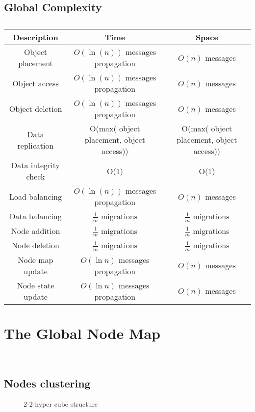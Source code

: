 \subsection{Global Complexity}
\begin{table}[h]
  \centering
  \begin{tabular}{|c|c|c|}
  \hline
  Description & Time & Space\\
  \hline
  Object placement & $O(\ln(n))$ messages propagation &  $O(n)$ messages  \\
  Object access & $O(\ln(n))$ messages propagation &  $O(n)$ messages \\
  Object deletion & $O(\ln(n))$ messages propagation &  $O(n)$ messages \\
  Data replication & O(max( object placement, object access)) & O(max( object placement, object access))\\
  Data integrity check & O(1) & O(1) \\
  Load balancing & $O(\ln(n))$ messages propagation &  $O(n)$ messages \\
  Data balancing & $\frac{1}{m}$ migrations & $\frac{1}{m}$ migrations\\ %
  Node addition & $\frac{1}{m}$ migrations & $\frac{1}{m}$ migrations\\
  Node deletion & $\frac{1}{m}$ migrations & $\frac{1}{m}$ migrations\\
  Node map update & $O(\ln{n})$ messages propagation & $O(n)$ messages\\
  Node state update & $O(\ln{n})$ messages propagation & $O(n)$ messages\\
  \hline
  \end{tabular}
  \caption{}
\end{table}


\section{The Global Node Map}
\

\subsection{Nodes clustering}
  \begin{figure}[h]
    \label{node-clustering}
    \centering
    \scalebox{0.9}{
      
    }
    \caption{2-2-hyper cube structure}
  \end{figure}
  
